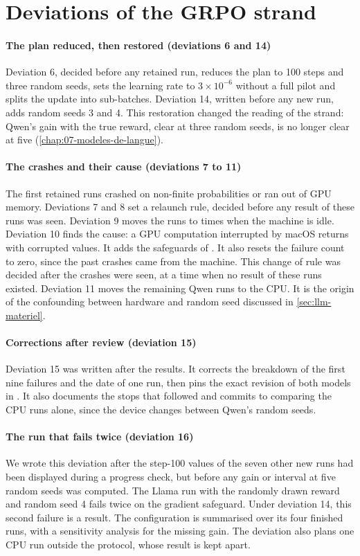 \section{Deviations of the GRPO strand}
\label{sec:ecarts-llm}

\paragraph{The plan reduced, then restored (deviations 6 and 14)} Deviation 6, decided before any
retained run, reduces the plan to 100 steps and three random seeds, sets the learning rate to
$3 \times 10^{-6}$ without a full pilot and splits the update into sub-batches. Deviation 14, written
before any new run, adds random seeds 3 and 4. This restoration changed the
reading of the strand: Qwen's gain with the true reward, clear at three random seeds, is no longer
clear at five (\cref{chap:07-modeles-de-langue}).

\paragraph{The crashes and their cause (deviations 7 to 11)} The first retained runs crashed on
non-finite probabilities or ran out of GPU memory. Deviations 7 and 8 set a relaunch rule, decided
before any result of these runs was seen. Deviation 9 moves the runs to times when the machine is idle. Deviation 10 finds
the cause: a GPU computation interrupted by macOS returns with corrupted values. It adds the
safeguards of . It also resets the failure count to zero, since the past crashes came
from the machine. This change of rule was decided after the crashes were seen, at a time when no
result of these runs existed. Deviation 11 moves the remaining Qwen runs to the CPU. It is the
origin of the confounding between hardware and random seed discussed in \cref{sec:llm-materiel}.

\paragraph{Corrections after review (deviation 15)} Deviation 15 was written after
the results. It corrects the breakdown of the first nine failures and the date of one run,
then pins the exact revision of both models in . It also documents the stops
that followed and commits to comparing the CPU runs alone, since the device changes between Qwen's
random seeds.

\paragraph{The run that fails twice (deviation 16)} We wrote this deviation
after the step-100 values of the seven other new runs had been displayed during a progress check,
but before any gain or interval at five random seeds was computed. The Llama run with the randomly
drawn reward and random seed 4 fails twice on the gradient safeguard. Under deviation 14, this second
failure is a result. The configuration is summarised over its four finished runs, with a sensitivity
analysis for the missing gain. The deviation also plans one CPU run outside the protocol, whose
result is kept apart.

